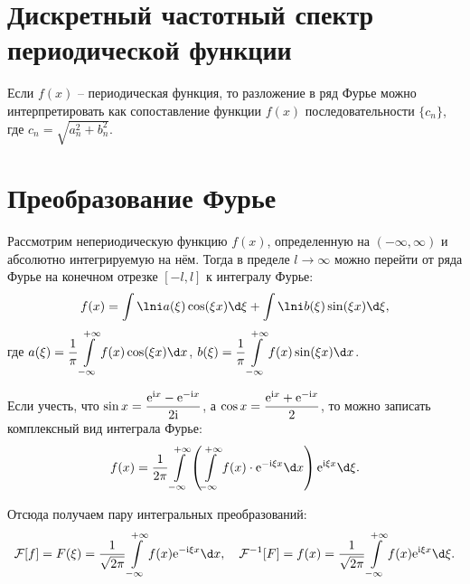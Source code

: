\section{Дискретный частотный спектр периодической функции}
Если \( f(x) \) -- периодическая функция, то разложение в ряд Фурье можно
интерпретировать как сопоставление функции \( f(x) \) последовательности
\( \{c_n\} \), где \( c_n = \sqrt{a_n^2 + b_n^2} \).

\section{Преобразование Фурье}
Рассмотрим непериодическую функцию \( f(x) \), определенную на \( (-\infty,
\infty) \) и абсолютно интегрируемую на нём. Тогда в пределе \( l \to \infty \)
можно перейти от ряда Фурье на конечном отрезке \( [-l, l] \) к интегралу Фурье:
\[
    f(x) = \int\lni a(\xi)\cos(\xi x)\d\xi + \int\lni b(\xi)\sin(\xi x)\d\xi,
\]
где \( \ds a(\xi) = \frac{1}{\pi} \int\limits_{-\infty}^{+\infty}
f(x)\cos(\xi x)\d x \), \( \ds b(\xi) = \frac{1}{\pi}
\int\limits_{-\infty}^{+\infty} f(x)\sin(\xi x)\d x \).

Если учесть, что \( \displaystyle \sin x = \frac{\mathrm{e}^{\mathrm{i} x} - \mathrm{e}^{-\mathrm{i} x}}{2\mathrm{i}} \), а
\( \displaystyle \cos x = \frac{\mathrm{e}^{\mathrm{i} x} + \mathrm{e}^{-\mathrm{i} x}}{2} \), то можно записать
комплексный вид интеграла Фурье:
\[
    f(x) = \frac{1}{2\pi}\int\limits_{-\infty}^{+\infty} \left(
    \int\limits_{-\infty}^{+\infty} f(x)\cdot\e^{-\i\xi x}\d x\right)
    \e^{\i\xi x}\d\xi.
\]

Отсюда получаем пару интегральных преобразований:
\[
    \mathcal{F}[f] = F(\xi) = \frac{1}{\sqrt{2\pi}}
    \int\limits_{-\infty}^{+\infty} f(x)\e^{-\i\xi x}\d x, \quad
    \mathcal{F}^{-1}[F] = f(x) = \frac{1}{\sqrt{2\pi}}
    \int\limits_{-\infty}^{+\infty} f(x)\e^{\i\xi x}\d\xi.
\]
\newpage
